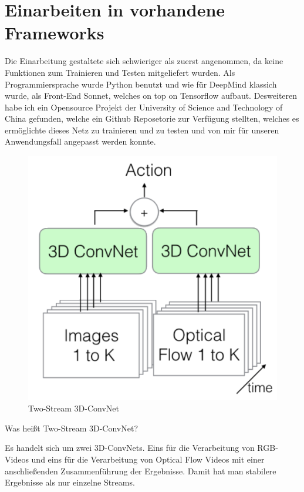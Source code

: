 \section{Einarbeiten in vorhandene Frameworks}
\label{sec:Einarbeiten}
Die Einarbeitung gestaltete sich schwieriger als zuerst angenommen, da keine Funktionen zum Trainieren und Testen mitgeliefert wurden. Als Programmiersprache wurde Python benutzt und wie für DeepMind klassich wurde, als Front-End Sonnet, welches on top on Tensorflow aufbaut. Desweiteren habe ich ein Opensource Projekt der University of Science and Technology of China gefunden, welche ein Github Reposetorie zur Verfügung stellten, welches es ermöglichte dieses Netz zu trainieren und zu testen und von mir für unseren Anwendungsfall angepasst werden konnte.

\begin{figure}[htb]
  \centering  
  \includegraphics[scale=0.5]{img/Two-Stream.png}
  \caption{Two-Stream 3D-ConvNet  \cite{DBLP:journals/corr/CarreiraZ17}}
  \label{fig:Two-Stream 3D-ConvNet}
\end{figure}

Was heißt Two-Stream 3D-ConvNet?

Es handelt sich um zwei 3D-ConvNets. Eins für die Verarbeitung von RGB-Videos und eins für die Verarbeitung von Optical Flow Videos mit einer anschließenden Zusammenführung der Ergebnisse. Damit hat man stabilere Ergebnisse als nur einzelne Streams.

